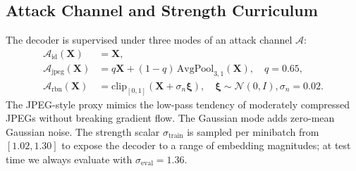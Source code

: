 \documentclass[runningheads]{llncs}
\begin{document}
\subsection{Attack Channel and Strength Curriculum}
\label{sec:attack}
The decoder is supervised under three modes of an attack channel $\mathcal{A}$:
\begin{align*}
    \mathcal{A}_{\text{id}}(\mathbf{X}) &= \mathbf{X}, \\
    \mathcal{A}_{\text{jpeg}}(\mathbf{X}) &= q\mathbf{X}+(1-q)\,\mathrm{AvgPool}_{3,1}(\mathbf{X}),\quad q=0.65, \\
    \mathcal{A}_{\text{rbn}}(\mathbf{X}) &= \mathrm{clip}_{[0,1]}(\mathbf{X}+\sigma_{n}\boldsymbol{\xi}),\quad \boldsymbol{\xi}\!\sim\!\mathcal{N}(0,I), \sigma_{n}=0.02.
\end{align*}
The JPEG-style proxy mimics the low-pass tendency of moderately compressed JPEGs without breaking gradient flow. The Gaussian mode adds zero-mean Gaussian noise. The strength scalar $\sigma_{\text{train}}$ is sampled per minibatch from $[1.02,1.30]$ to expose the decoder to a range of embedding magnitudes; at test time we always evaluate with $\sigma_{\text{eval}}=1.36$.
\end{document}
